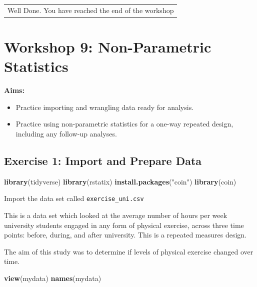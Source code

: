 \documentclass[
]{book}
\newenvironment{Shaded}{\begin{snugshade}}{\end{snugshade}}
\newcommand{\FunctionTok}[1]{\textcolor[rgb]{0.13,0.29,0.53}{\textbf{#1}}}
\newcommand{\NormalTok}[1]{#1}
\newcommand{\StringTok}[1]{\textcolor[rgb]{0.31,0.60,0.02}{#1}}
\providecommand{\tightlist}{%
  \setlength{\itemsep}{0pt}\setlength{\parskip}{0pt}}
\let\oldsection\section
\renewcommand{\section}{\needspace{5\baselineskip}\oldsection}
\begin{document}
\begin{longtable}[]{@{}l@{}}
\toprule\noalign{}
\endhead
\bottomrule\noalign{}
\endlastfoot
Well Done. You have reached the end of the workshop \\
\end{longtable}

\chapter{Workshop 9: Non-Parametric Statistics}\label{workshop-9-non-parametric-statistics}

\textbf{Aims:}

\begin{itemize}
\tightlist
\item
  Practice importing and wrangling data ready for analysis.
\item
  Practice using non-parametric statistics for a one-way repeated design, including any follow-up analyses.
\end{itemize}

\section{Exercise 1: Import and Prepare Data}\label{exercise-1-import-and-prepare-data}

\begin{Shaded}
\begin{Highlighting}[]
\FunctionTok{library}\NormalTok{(tidyverse)}
\FunctionTok{library}\NormalTok{(rstatix)}
\FunctionTok{install.packages}\NormalTok{(}\StringTok{"coin"}\NormalTok{)}
\FunctionTok{library}\NormalTok{(coin)}
\end{Highlighting}
\end{Shaded}

Import the data set called \texttt{exercise\_uni.csv}

This is a data set which looked at the average number of hours per week university students engaged in any form of physical exercise, across three time points: before, during, and after university. This is a repeated measures design.

The aim of this study was to determine if levels of physical exercise changed over time.

\begin{Shaded}
\begin{Highlighting}[]
\FunctionTok{view}\NormalTok{(mydata)}
\FunctionTok{names}\NormalTok{(mydata)}
\end{Highlighting}
\end{Shaded}
\end{document}

